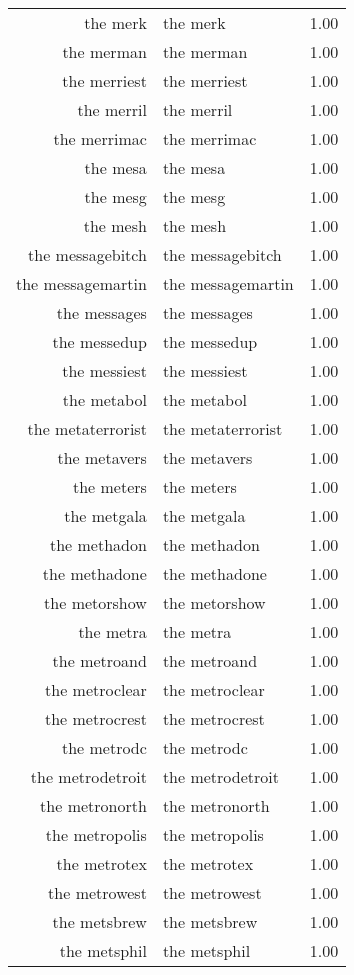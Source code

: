 \begin{table}[ht]
\begin{tabular}{rlr}
  the merk & the merk & 1.00 \\ 
  the merman & the merman & 1.00 \\ 
  the merriest & the merriest & 1.00 \\ 
  the merril & the merril & 1.00 \\ 
  the merrimac & the merrimac & 1.00 \\ 
  the mesa & the mesa & 1.00 \\ 
  the mesg & the mesg & 1.00 \\ 
  the mesh & the mesh & 1.00 \\ 
  the messagebitch & the messagebitch & 1.00 \\ 
  the messagemartin & the messagemartin & 1.00 \\ 
  the messages & the messages & 1.00 \\ 
  the messedup & the messedup & 1.00 \\ 
  the messiest & the messiest & 1.00 \\ 
  the metabol & the metabol & 1.00 \\ 
  the metaterrorist & the metaterrorist & 1.00 \\ 
  the metavers & the metavers & 1.00 \\ 
  the meters & the meters & 1.00 \\ 
  the metgala & the metgala & 1.00 \\ 
  the methadon & the methadon & 1.00 \\ 
  the methadone & the methadone & 1.00 \\ 
  the metorshow & the metorshow & 1.00 \\ 
  the metra & the metra & 1.00 \\ 
  the metroand & the metroand & 1.00 \\ 
  the metroclear & the metroclear & 1.00 \\ 
  the metrocrest & the metrocrest & 1.00 \\ 
  the metrodc & the metrodc & 1.00 \\ 
  the metrodetroit & the metrodetroit & 1.00 \\ 
  the metronorth & the metronorth & 1.00 \\ 
  the metropolis & the metropolis & 1.00 \\ 
  the metrotex & the metrotex & 1.00 \\ 
  the metrowest & the metrowest & 1.00 \\ 
  the metsbrew & the metsbrew & 1.00 \\ 
  the metsphil & the metsphil & 1.00 \\ 

\end{tabular}
\end{table}
